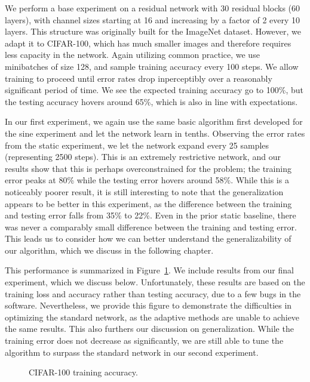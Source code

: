 We perform a base experiment on a residual network with 30 residual blocks (60 layers), with channel sizes starting at 16 and increasing by a factor of 2 every 10 layers.
This structure was originally built for the ImageNet dataset.
However, we adapt it to CIFAR-100, which has much smaller images and therefore requires less capacity in the network.
Again utilizing common practice, we use minibatches of size 128, and sample training accuracy every 100 steps.
We allow training to proceed until error rates drop inperceptibly over a reasonably significant period of time.
We see the expected training accuracy go to 100\%, but the testing accuracy hovers around 65\%, which is also in line with expectations.

In our first experiment, we again use the same basic algorithm first developed for the sine experiment and let the network learn in tenths.
Observing the error rates from the static experiment, we let the network expand every 25 samples (representing 2500 steps).
This is an extremely restrictive network, and our results show that this is perhaps overconstrained for the problem; the training error peaks at 80\% while the testing error hovers around 58\%.
While this is a noticeably poorer result, it is still interesting to note that the generalization appears to be better in this experiment, as the difference between the training and testing error falls from 35\% to 22\%.
Even in the prior static baseline, there was never a comparably small difference between the training and testing error.
This leads us to consider how we can better understand the generalizability of our algorithm, which we discuss in the following chapter.

This performance is summarized in Figure~\ref{fig:cifar_accuracy}. %
We include results from our final experiment, which we discuss below.
Unfortunately, these results are based on the training loss and accuracy rather than testing accuracy, due to a few bugs in the software.
Nevertheless, we provide this figure to demonstrate the difficulties in optimizing the standard network, as the adaptive methods are unable to achieve the same results.
This also furthers our discussion on generalization.
While the training error does not decrease as significantly, we are still able to tune the algorithm to surpass the standard network in our second experiment.


\begin{figure}[!htb]
\centering
\resizebox{0.8\textwidth}{!}{}
\caption{CIFAR-100 training accuracy.}
\label{fig:cifar_accuracy}
\end{figure}

